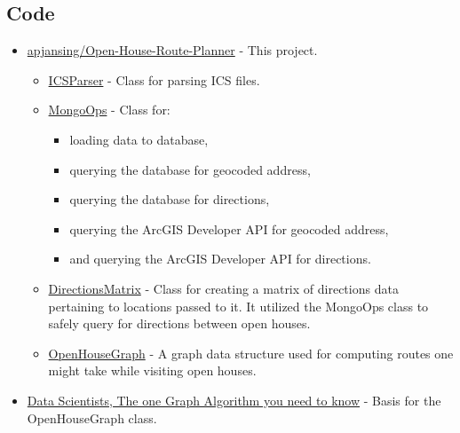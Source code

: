 \documentclass[11 pt]{article}
\theoremstyle{definition}
\theoremstyle{definition}
\begin{document}
\subsection{Code}
\begin{itemize}
  \item \href{https://github.com/apjansing/Open-House-Route-Planner}{apjansing/Open-House-Route-Planner} - This project.
    \begin{itemize}
      \item \href{https://github.com/apjansing/Open-House-Route-Planner/blob/master/backend/docker/persistence/pyspark/ICSParser.py}{ICSParser} - Class for parsing ICS files.
      \item \href{https://github.com/apjansing/Open-House-Route-Planner/blob/master/backend/docker/persistence/pyspark/MongoOps.py}{MongoOps} - Class for:
        \begin{itemize}
          \item loading data to database, 
          \item querying the database for geocoded address,
          \item querying the database for directions,
          \item querying the ArcGIS Developer API for geocoded address,
          \item and querying the ArcGIS Developer API for directions.
        \end{itemize}
      \item \href{https://github.com/apjansing/Open-House-Route-Planner/blob/master/backend/docker/persistence/pyspark/make_directions_matrix.py}{DirectionsMatrix} - Class for creating a matrix of directions data pertaining to locations passed to it. It utilized the MongoOps class to safely query for directions between open houses.
      \item \href{https://github.com/apjansing/Open-House-Route-Planner/blob/master/backend/docker/persistence/pyspark/OpenHouseGraph.py}{OpenHouseGraph} - A graph data structure used for computing routes one might take while visiting open houses.

    \end{itemize}
  \item \href{https://towardsdatascience.com/to-all-data-scientists-the-one-graph-algorithm-you-need-to-know-59178dbb1ec2}{Data Scientists, The one Graph Algorithm you need to know}\cite{Agarwal} - Basis for the OpenHouseGraph class.
\end{itemize}
\end{document}
